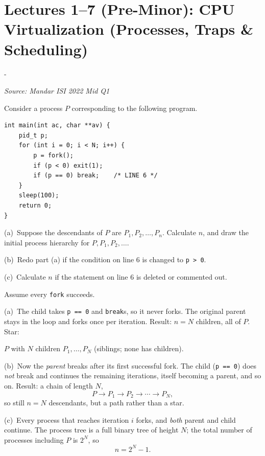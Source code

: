 \documentclass[11pt,a4paper]{article}
\makeatletter
\newcommand{\keepspace}[1]{\par\penalty-100\begingroup
  \setlength{\dimen@}{#1}\dimen@ii\pagegoal\advance\dimen@ii-\pagetotal
  \ifdim\dimen@>\dimen@ii\ifdim\dimen@ii>\z@\vfil\fi\break\fi\endgroup}
\newcounter{qn}[section]
\newenvironment{Qn}[4]{%
  \refstepcounter{qn}\keepspace{7\baselineskip}%
  \begin{tcolorbox}[qboxstyle, title={Q\thesection.\theqn\ \ [#1 \textbar\ #2]\ \ #4}]%
  {\footnotesize\color{g3}\textit{Source: #3}}\par\smallskip%
}{%
  \end{tcolorbox}%
}
\newenvironment{Sol}{%
  \begin{tcolorbox}[sboxstyle, title={Solution}]%
}{%
  \end{tcolorbox}\vspace{0.35em}%
}
\makeatother
\begin{document}
\clearpage

\section{Lectures 1--7 (Pre-Minor): CPU Virtualization (Processes, Traps \& Scheduling)}

\begin{Qn}{Hard}{Lect 3}{Mandar ISI 2022 Mid Q1}{\texttt{fork} loop: break on child, break on parent, or no break}
Consider a process $P$ corresponding to the following program.
\begin{lstlisting}[numbers=none]
int main(int ac, char **av) {
    pid_t p;
    for (int i = 0; i < N; i++) {
        p = fork();
        if (p < 0) exit(1);
        if (p == 0) break;    /* LINE 6 */
    }
    sleep(100);
    return 0;
}
\end{lstlisting}
(a)~Suppose the descendants of $P$ are $P_1,P_2,\ldots,P_n$. Calculate $n$, and draw the initial process hierarchy for $P,P_1,P_2,\ldots$.

(b)~Redo part (a) if the condition on line 6 is changed to \texttt{p > 0}.

(c)~Calculate $n$ if the statement on line 6 is deleted or commented out.
\end{Qn}
\begin{Sol}
Assume every \texttt{fork} succeeds.

(a)~The child takes \texttt{p == 0} and \texttt{break}s, so it never forks. The original parent stays in the loop and forks once per iteration. Result: $n=N$ children, all of $P$. Star:
\begin{center}
$P$ with $N$ children $P_1,\ldots,P_N$ (siblings; none has children).
\end{center}

(b)~Now the \emph{parent} breaks after its first successful fork. The child (\texttt{p == 0}) does \emph{not} break and continues the remaining iterations, itself becoming a parent, and so on. Result: a chain of length $N$,
\[
P \to P_1 \to P_2 \to \cdots \to P_N,
\]
so still $n=N$ descendants, but a path rather than a star.

(c)~Every process that reaches iteration $i$ forks, and \emph{both} parent and child continue. The process tree is a full binary tree of height $N$; the total number of processes including $P$ is $2^N$, so
\[
n = 2^N - 1.
\]
\end{Sol}
\end{document}
